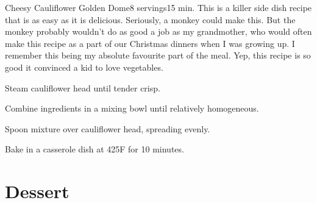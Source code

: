 \begin{recipe}{Cheesy Cauliflower Golden Dome}{8 servings}{15 min.}
\freeform This is a killer side dish recipe that is as easy as it is delicious.
Seriously, a monkey could make this. But the monkey probably wouldn't do as good
a job as my grandmother, who would often make this recipe as a part of our
Christmas dinners when I was growing up. I remember this being my absolute
favourite part of the meal. Yep, this recipe is so good it convinced a kid to
love vegetables.

Steam cauliflower head until tender crisp.

Combine ingredients in a mixing bowl until relatively homogeneous.

\newstep Spoon mixture over cauliflower head, spreading evenly.

\newstep Bake in a casserole dish at 425\0F for 10 minutes.
\end{recipe}

\section{Dessert}
\label{sec:findlay-dessert}

\clearpage
